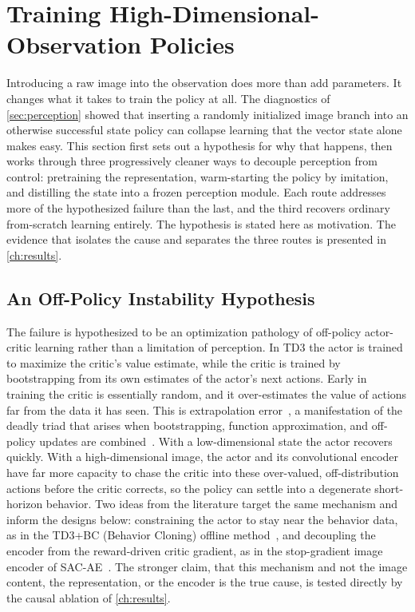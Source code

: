 \section{Training High-Dimensional-Observation Policies}
\label{sec:highdim_training}

Introducing a raw image into the observation does more than add parameters. It changes what it takes to train the policy at all. The diagnostics of \cref{sec:perception} showed that inserting a randomly initialized image branch into an otherwise successful state policy can collapse learning that the vector state alone makes easy. This section first sets out a hypothesis for why that happens, then works through three progressively cleaner ways to decouple perception from control: pretraining the representation, warm-starting the policy by imitation, and distilling the state into a frozen perception module. Each route addresses more of the hypothesized failure than the last, and the third recovers ordinary from-scratch learning entirely. The hypothesis is stated here as motivation. The evidence that isolates the cause and separates the three routes is presented in \cref{ch:results}.

\subsection{An Off-Policy Instability Hypothesis}

The failure is hypothesized to be an optimization pathology of off-policy actor-critic learning rather than a limitation of perception. In TD3 the actor is trained to maximize the critic's value estimate, while the critic is trained by bootstrapping from its own estimates of the actor's next actions. Early in training the critic is essentially random, and it over-estimates the value of actions far from the data it has seen. This is extrapolation error~\cite{fujimoto2019bcq}, a manifestation of the deadly triad that arises when bootstrapping, function approximation, and off-policy updates are combined~\cite{sutton2018rl}. With a low-dimensional state the actor recovers quickly. With a high-dimensional image, the actor and its convolutional encoder have far more capacity to chase the critic into these over-valued, off-distribution actions before the critic corrects, so the policy can settle into a degenerate short-horizon behavior. Two ideas from the literature target the same mechanism and inform the designs below: constraining the actor to stay near the behavior data, as in the TD3+BC (Behavior Cloning) offline method~\cite{fujimoto2021td3bc}, and decoupling the encoder from the reward-driven critic gradient, as in the stop-gradient image encoder of SAC-AE~\cite{yarats2021sacae}. The stronger claim, that this mechanism and not the image content, the representation, or the encoder is the true cause, is tested directly by the causal ablation of \cref{ch:results}.

